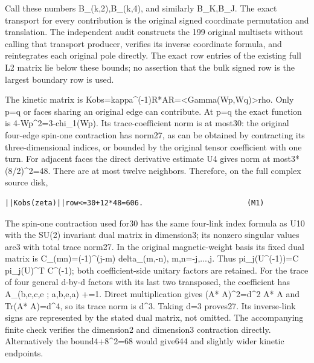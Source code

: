 \documentclass[11pt,a4paper]{article}
\renewcommand{\[}{\begingroup\small\originaldisplaystart}
\renewcommand{\]}{\originaldisplayend\endgroup}
\begin{document}
Call these numbers B\_(k,2),B\_(k,4), and similarly B\_K,B\_J. The exact
transport for every contribution is the original signed coordinate
permutation and translation. The independent audit constructs the 199
original multisets without calling that transport producer, verifies its
inverse coordinate formula, and reintegrates each original pole
directly. The exact row entries of the existing full L2 matrix lie below
these bounds; no assertion that the bulk signed row is the largest
boundary row is used.

The kinetic matrix is
{K\allowbreak{}o\allowbreak{}b\allowbreak{}s\allowbreak{}=\allowbreak{}k\allowbreak{}a\allowbreak{}p\allowbreak{}p\allowbreak{}a\allowbreak{}\textasciicircum{}\allowbreak{}(\allowbreak{}-\allowbreak{}1\allowbreak{})\allowbreak{}R\allowbreak{}*\allowbreak{}A\allowbreak{}R\allowbreak{}=\allowbreak{}\textless{}\allowbreak{}G\allowbreak{}a\allowbreak{}m\allowbreak{}m\allowbreak{}a\allowbreak{}(\allowbreak{}W\allowbreak{}p\allowbreak{},\allowbreak{}W\allowbreak{}q\allowbreak{})\allowbreak{}\textgreater{}\allowbreak{}r\allowbreak{}h\allowbreak{}o\allowbreak{}.\allowbreak{}}
Only p=q or faces sharing an original edge can contribute. At p=q the
exact function is
{4\allowbreak{}-\allowbreak{}W\allowbreak{}p\allowbreak{}\textasciicircum{}\allowbreak{}2\allowbreak{}=\allowbreak{}3\allowbreak{}-\allowbreak{}c\allowbreak{}h\allowbreak{}i\allowbreak{}\_\allowbreak{}1\allowbreak{}(\allowbreak{}W\allowbreak{}p\allowbreak{})\allowbreak{}.\allowbreak{}}
Its trace-coefficient norm is at most30: the original four-edge spin-one
contraction has norm27, as can be obtained by contracting its
three-dimensional indices, or bounded by the original tensor coefficient
with one turn. For adjacent faces the direct derivative estimate U4
gives norm at most3*(8/2)\^{}2=48. There are at most twelve neighbors.
Therefore, on the full complex source disk,

\begin{verbatim}
||Kobs(zeta)||row<=30+12*48=606.                        (M1)
\end{verbatim}

The spin-one contraction used for30 has the same four-link index formula
as U10 with the SU(2) invariant dual matrix in dimension3; its nonzero
singular values are3 with total trace norm27. In the original
magnetic-weight basis its fixed dual matrix is C\_(mn)=(-1)\^{}(j-m)
delta\_(m,-n), m,n=-j,...,j. Thus pi\_j(U\^{}(-1))=C pi\_j(U)\^{}T
C\^{}(-1); both coefficient-side unitary factors are retained. For the
trace of four general d-by-d factors with its last two transposed, the
coefficient has A\_(b,c,c,e ; a,b,e,a) +=1. Direct multiplication gives
(A* A)\^{}2=d\^{}2 A* A and Tr(A* A)=d\^{}4, so its trace norm is
d\^{}3. Taking d=3 proves27. Its inverse-link signs are represented by
the stated dual matrix, not omitted. The accompanying finite check
verifies the dimension2 and dimension3 contraction directly.
Alternatively the bound4+8\^{}2=68 would give644 and slightly wider
kinetic endpoints.
\end{document}
